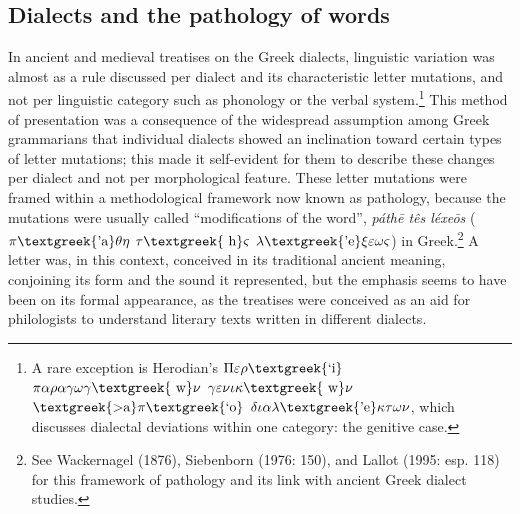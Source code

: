 \subsection{Dialects and the pathology of words}
\hypertarget{Toc19704844}{}\begin{styleCatalogusnotities}
In ancient and medieval treatises on the Greek dialects, linguistic variation was almost as a rule discussed per dialect and its characteristic letter mutations, and not per linguistic category such as phonology or the verbal system.\footnote{\textrm{ A rare exception is Herodian’s $\Pi \varepsilon \rho \text{\textgreek{`i}}$ $\pi \alpha \rho \alpha \gamma \omega \gamma \text{\textgreek{~w}}\nu $ $\gamma \varepsilon \nu \iota \kappa \text{\textgreek{~w}}\nu $ $\text{\textgreek{>a}}\pi \text{\textgreek{`o}}$ $\delta \iota \alpha \lambda \text{\textgreek{'e}}\kappa \tau \omega \nu $, which discusses dialectal deviations within one category: the genitive case.}} This method of presentation was a consequence of the widespread assumption among Greek grammarians that individual dialects showed an inclination toward certain types of letter mutations; this made it self-evident for them to describe these changes per dialect and not per morphological feature. These letter mutations were framed within a methodological framework now known as pathology, because the mutations were usually called “modifications of the word”, \textit{páth\=e tês léxe\=os} ($\pi \text{\textgreek{'a}}\theta \eta $ $\tau \text{\textgreek{~h}}\varsigma $ $\lambda \text{\textgreek{'e}}\xi \varepsilon \omega \varsigma $) in Greek.\footnote{\textrm{ See Wackernagel (1876), Siebenborn (1976: 150), and Lallot (1995: esp. 118) for this framework of pathology and its link with ancient Greek dialect studies.}} A letter was, in this context, conceived in its traditional ancient meaning, conjoining its form and the sound it represented, but the emphasis seems to have been on its formal appearance, as the treatises were conceived as an aid for philologists to understand literary texts written in different dialects.
\end{styleCatalogusnotities}


